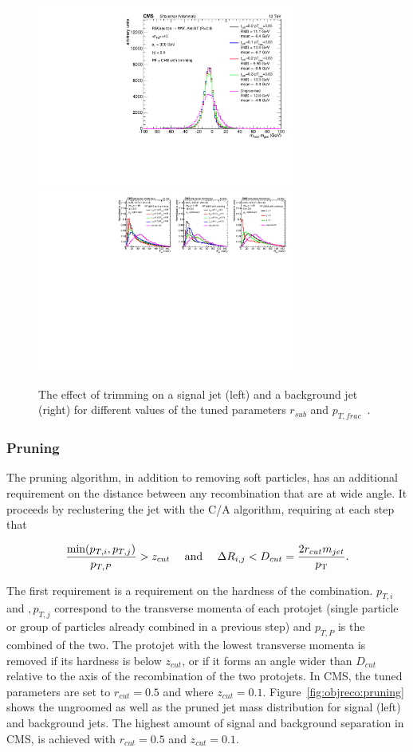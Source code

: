 \begin{figure}[ht] 
    \centering 
    \includegraphics[height=6cm]{figures/event_reconstruction/sig_trimming.pdf}
    \includegraphics[height=6cm]{figures/event_reconstruction/bkg_trimming-noData.pdf}
    \caption{The effect of trimming on a signal jet (left) and a background jet (right) for different values of the tuned parameters $r_{sub}$ and $p_{T,frac}$~\cite{CMS-PAS-JME-14-001}.}
    \label{fig:objreco:trimming}
\end{figure}

\subsubsection{Pruning}
The pruning algorithm, in addition to removing soft particles, has an additional requirement on the distance between any recombination that are at wide angle.
It proceeds by reclustering the jet with the C/A algorithm, requiring at each step that

\begin{equation*}
\frac{ \textrm{min}(p_{T,i},p_{T,j}) }{ p_{T,P} } > z_{cut} \quad \textrm{ and } \quad \Delta R_{i,j} < D_{cut} = \frac{2 r_{cut} m_{jet}}{p_{\mathrm{T}}}.
\end{equation*}

The first requirement is a requirement on the hardness of the combination. $p_{T,i}$ and $,p_{T,j}$ correspond to the transverse momenta of each protojet (single particle or group of particles already combined in a previous step) and $p_{T,P}$ is the combined \PT of the two. The protojet with the lowest transverse momenta is removed if its hardness is below $z_{cut}$, or if it forms an angle wider than $D_{cut}$ relative to the axis of the recombination of the two protojets. In CMS, the tuned parameters are set to $r_{cut}=0.5$ and where $z_{cut}=0.1$. Figure~\ref{fig:objreco:pruning} shows the ungroomed as well as the pruned jet mass distribution for signal (left) and background jets. The highest amount of signal and background separation in CMS, is achieved with $r_{cut}=0.5$ and $z_{cut}=0.1$.

